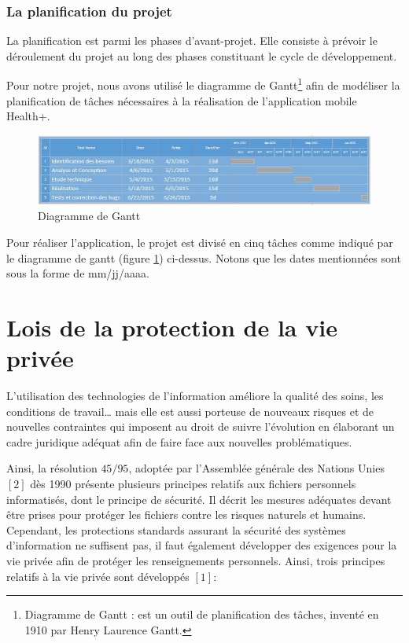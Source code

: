 \subsubsection{La planification du projet}

La planification est parmi les phases d’avant-projet. Elle consiste à prévoir le déroulement du projet au long des phases constituant le cycle de développement.

\vspace{6pt}
\paragraphmark

Pour notre projet, nous avons utilisé le diagramme de Gantt\footnote{Diagramme de Gantt : est un outil de planification des tâches, inventé en 1910 par Henry Laurence Gantt.} afin de modéliser la planification de tâches nécessaires à la réalisation de l'application mobile Health+.

\begin{figure}[!ht]
\begin{center}
\includegraphics[scale=0.75]{gantt.JPG}
\caption{Diagramme de Gantt}
\label{gantt}
\end{center}
\end{figure}

Pour réaliser l'application, le projet est divisé en cinq tâches comme indiqué par le diagramme de gantt (figure \ref{gantt}) ci-dessus. Notons que les dates mentionnées sont sous la forme de mm/jj/aaaa.
	
\section{Lois de la protection de la vie privée}

L’utilisation des technologies de l’information améliore la qualité des soins, les conditions de travail… mais elle est aussi porteuse de nouveaux risques et de nouvelles contraintes qui imposent au droit de suivre l’évolution en élaborant un cadre juridique adéquat afin de faire face aux nouvelles problématiques.

\vspace{6pt}
\paragraphmark

Ainsi, la résolution $45/95$, adoptée par l’Assemblée générale des Nations Unies $[2]$ dès 1990 présente plusieurs principes relatifs aux fichiers personnels informatisés, dont le principe de sécurité. Il décrit les mesures adéquates devant être prises pour protéger les fichiers contre les risques naturels et humains. Cependant, les protections standards assurant la sécurité des systèmes d’information ne suffisent pas, il faut également développer des exigences pour la vie privée afin de protéger les renseignements personnels. Ainsi, trois principes relatifs à la vie privée sont développés $[1]$:

